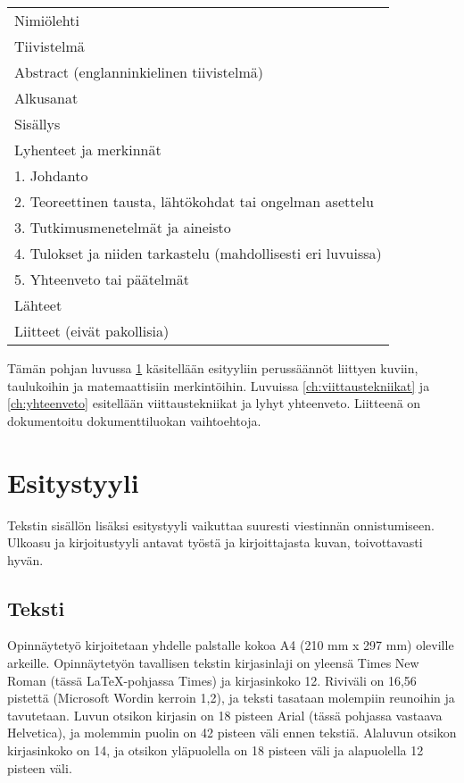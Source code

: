 \documentclass[globalnumbering,centeredcaptions]{tutthesis/tutthesis} %
\begin{document}
\begin{tabular}[h]{l}
Nimiölehti\\
Tiivistelmä\\
Abstract (englanninkielinen tiivistelmä)\\
Alkusanat\\
Sisällys\\
Lyhenteet ja merkinnät\\
1. Johdanto\\
2. Teoreettinen tausta, lähtökohdat tai ongelman asettelu \\
3. Tutkimusmenetelmät ja aineisto \\
4. Tulokset ja niiden tarkastelu (mahdollisesti eri luvuissa)\\
5. Yhteenveto tai päätelmät\\
Lähteet\\
Liitteet (eivät pakollisia)\\
\end{tabular}

Tämän pohjan luvussa \ref{ch:esitystyyli} käsitellään esityyliin perussäännöt liittyen kuviin, taulukoihin ja matemaattisiin merkintöihin.
Luvuissa \ref{ch:viittaustekniikat} ja \ref{ch:yhteenveto} esitellään viittaustekniikat ja lyhyt yhteenveto.
Liitteenä on dokumentoitu dokumenttiluokan vaihtoehtoja.



\chapter{Esitystyyli}
\label{ch:esitystyyli}

Tekstin sisällön lisäksi esitystyyli vaikuttaa suuresti viestinnän onnistumiseen.
Ulkoasu ja kirjoitustyyli antavat työstä ja kirjoittajasta kuvan, toivottavasti hyvän.

\section{Teksti}

Opinnäytetyö kirjoitetaan yhdelle palstalle kokoa A4 (210 mm x 297 mm) oleville arkeille.
Opinnäytetyön tavallisen tekstin kirjasinlaji on yleensä Times New Roman (tässä LaTeX-pohjassa Times) ja kirjasinkoko 12.
Riviväli on 16,56 pistettä (Microsoft Wordin kerroin 1,2), ja teksti tasataan molempiin reunoihin ja tavutetaan.
Luvun otsikon kirjasin on 18 pisteen Arial (tässä pohjassa vastaava Helvetica), ja molemmin puolin on 42 pisteen väli ennen tekstiä.
Alaluvun otsikon kirjasinkoko on 14, ja otsikon yläpuolella on 18 pisteen väli ja alapuolella 12 pisteen väli.
\end{document}
